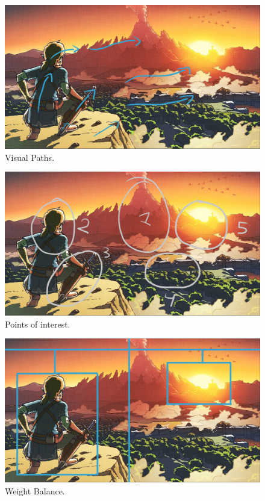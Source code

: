 \documentclass{cup-pan}
\begin{document}
            \begin{figure}[H]
                \includegraphics[width=\textwidth]{Imagenes/Referencias/Analisis_ConceptArt/recorridovisual.png}
                \caption{Visual Paths.}
            \end{figure}

            \begin{figure}[H]
                \includegraphics[width = \textwidth]{Imagenes/Referencias/Analisis_ConceptArt/puntos interes.png}
                \caption{Points of interest.}
            \end{figure}

            \begin{figure}[H]
                \includegraphics[width=\textwidth]{Imagenes/Referencias/Analisis_ConceptArt/balanza.png}
                \caption{Weight Balance.}
            \end{figure}
\end{document}
